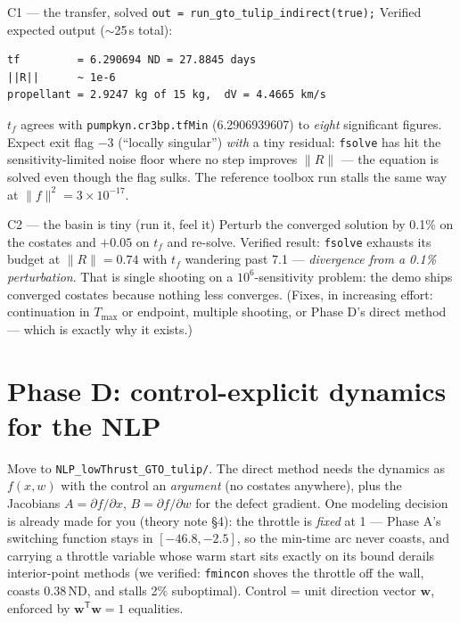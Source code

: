\documentclass[11pt,letterpaper]{article}
\newcommand{\T}{^{\mathsf{T}}}
\begin{document}
\begin{checkpoint}{C1 --- the transfer, solved}
\texttt{out = run\_gto\_tulip\_indirect(true);} Verified expected output
($\sim$25\,s total):
\begin{verbatim}
tf         = 6.290694 ND = 27.8845 days
||R||      ~ 1e-6
propellant = 2.9247 kg of 15 kg,  dV = 4.4665 km/s
\end{verbatim}
$t_f$ agrees with \texttt{pumpkyn.cr3bp.tfMin} (6.2906939607) to
\emph{eight} significant figures. Expect exit flag $-3$ (``locally
singular'') \emph{with} a tiny residual: \texttt{fsolve} has hit the
sensitivity-limited noise floor where no step improves $\|R\|$ --- the
equation is solved even though the flag sulks. The reference toolbox run
stalls the same way at $\|f\|^2 = 3\times10^{-17}$.
\end{checkpoint}

\begin{checkpoint}{C2 --- the basin is tiny (run it, feel it)}
Perturb the converged solution by 0.1\% on the costates and $+0.05$ on
$t_f$ and re-solve. Verified result: \texttt{fsolve} exhausts its budget
at $\|R\| = 0.74$ with $t_f$ wandering past 7.1 --- \emph{divergence from
a 0.1\% perturbation}. That is single shooting on a $10^6$-sensitivity
problem: the demo ships converged costates because nothing less converges.
(Fixes, in increasing effort: continuation in $T_{\max}$ or endpoint,
multiple shooting, or Phase D's direct method --- which is exactly why it
exists.)
\end{checkpoint}

\section{Phase D: control-explicit dynamics for the NLP}

Move to \texttt{NLP\_lowThrust\_GTO\_tulip/}. The direct method needs the
dynamics as $f(x, w)$ with the control an \emph{argument} (no costates
anywhere), plus the Jacobians $A = \partial f/\partial x$,
$B = \partial f/\partial w$ for the defect gradient. One modeling decision
is already made for you (theory note \S4): the throttle is \emph{fixed} at
1 --- Phase A's switching function stays in $[-46.8, -2.5]$, so the
min-time arc never coasts, and carrying a throttle variable whose warm
start sits exactly on its bound derails interior-point methods (we
verified: \texttt{fmincon} shoves the throttle off the wall, coasts
0.38\,ND, and stalls 2\% suboptimal). Control = unit direction vector
$\mathbf w$, enforced by $\mathbf w\T\mathbf w = 1$ equalities.
\end{document}
